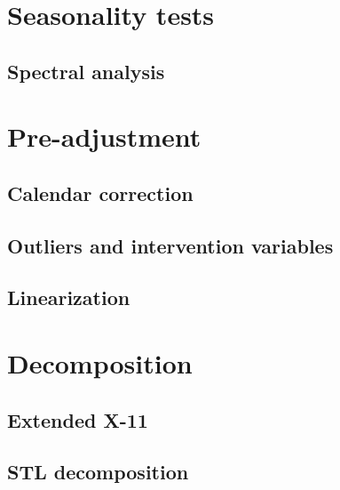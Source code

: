 \documentclass[
  letterpaper,
  DIV=11,
  numbers=noendperiod]{scrreprt}
\begin{document}
\hypertarget{seasonality-tests}{%
\section{Seasonality tests}\label{seasonality-tests}}

\hypertarget{spectral-analysis}{%
\subsection{Spectral analysis}\label{spectral-analysis}}

\hypertarget{pre-adjustment}{%
\section{Pre-adjustment}\label{pre-adjustment}}

\hypertarget{calendar-correction}{%
\subsection{Calendar correction}\label{calendar-correction}}

\hypertarget{outliers-and-intervention-variables}{%
\subsection{Outliers and intervention
variables}\label{outliers-and-intervention-variables}}

\hypertarget{linearization}{%
\subsection{Linearization}\label{linearization}}

\hypertarget{decomposition}{%
\section{Decomposition}\label{decomposition}}

\hypertarget{extended-x-11}{%
\subsection{Extended X-11}\label{extended-x-11}}

\hypertarget{stl-decomposition}{%
\subsection{STL decomposition}\label{stl-decomposition}}
\end{document}
